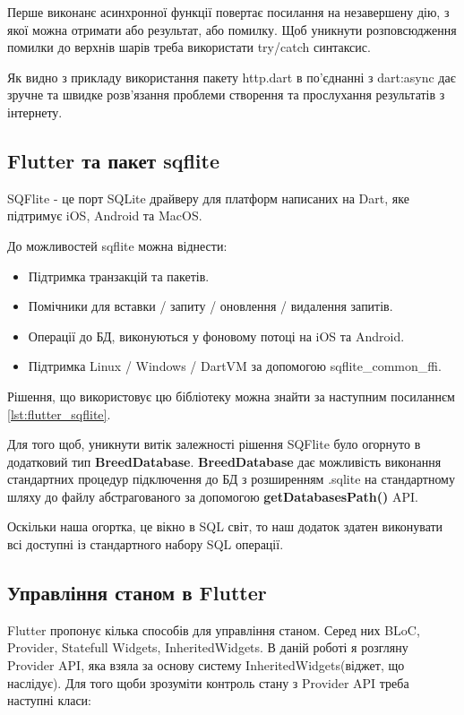Перше виконанє асинхронної функції повертає посилання на незавершену дію, з якої можна отримати або результат, або помилку.
Щоб уникнути розповсюдження помилки до верхнів шарів треба використати try/catch синтаксис.

Як видно з прикладу використання пакету http.dart в по'єднанні з dart:async дає зручне
та швидке розв'язання проблеми створення та прослухання результатів з інтернету.

\subsection{Flutter та пакет sqflite}
\label{subsec:flutter_sqflite_theory}
SQFlite - це порт SQLite драйверу для платформ написаних на Dart, яке підтримує iOS, Android та MacOS.

До можливостей sqflite можна віднести:

\begin{itemize}
    \item Підтримка транзакцій та пакетів.
    \item Помічники для вставки / запиту / оновлення / видалення запитів.
    \item Операції до БД, виконуються у фоновому потоці на iOS та Android.
    \item Підтримка Linux / Windows / DartVM за допомогою sqflite_common_ffi.
\end{itemize}

Рішення, що використовує цю бібліотеку можна знайти за наступним посиланнєм \ref{lst:flutter_sqflite}.

Для того щоб, уникнути витік залежності рішення SQFlite було огорнуто в додатковий тип \textbf{BreedDatabase}.
\textbf{BreedDatabase} дає можливість виконання стандартних процедур підключення до БД з розширенням .sqlite
на стандартному шляху до файлу абстрагованого за допомогою \textbf{getDatabasesPath()} API.

Оскільки наша огортка, це вікно в SQL світ, то наш додаток здатен виконувати всі доступні із стандартного набору
SQL операції.

\subsection{Управління станом в Flutter}
\label{subsec:flutter_state_app}
Flutter пропонує кілька способів для управління станом. Серед них BLoC, Provider, Statefull Widgets, InheritedWidgets.
В даній роботі я розгляну Provider API, яка взяла за основу систему InheritedWidgets(віджет, що наслідує).
Для того щоби зрозуміти контроль стану з Provider API треба наступні класи:

